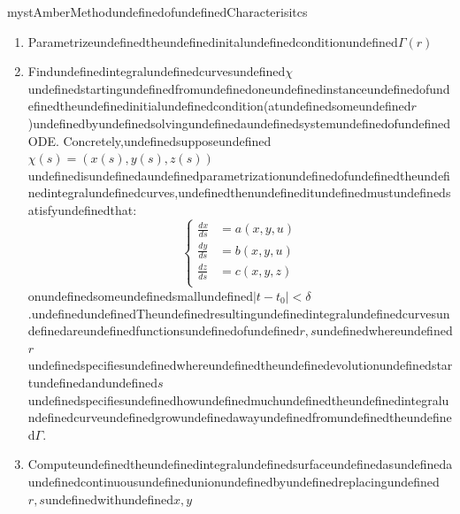 \begin{mystadmonition}{mystAmber}{MethodundefinedofundefinedCharacterisitcs}\begin{enumerate}
\item Parametrizeundefinedtheundefinedinitalundefinedconditionundefined$\Gamma(r)$
\item Findundefinedintegralundefinedcurvesundefined$\chi$undefinedstartingundefinedfromundefinedoneundefinedinstanceundefinedofundefinedtheundefinedinitialundefinedcondition(atundefinedsomeundefined$r$)undefinedbyundefinedsolvingundefinedaundefinedsystemundefinedofundefinedODE.
Concretely,undefinedsupposeundefined$\chi(s) = (x(s),y(s),z(s))$undefinedisundefinedaundefinedparametrizationundefinedofundefinedtheundefinedintegralundefinedcurves,undefinedthenundefineditundefinedmustundefinedsatisfyundefinedthat:
\begin{equation}
\begin{cases}
\frac{dx}{ds}&=a(x,y,u) \\
\frac{dy}{ds}&=b(x,y,u) \\
\frac{dz}{ds}&=c(x,y,z) \\
\end{cases}
\end{equation}
onundefinedsomeundefinedsmallundefined$|t -t_0|<\delta$.undefinedundefinedTheundefinedresultingundefinedintegralundefinedcurvesundefinedareundefinedfunctionsundefinedofundefined$r,s$undefinedwhereundefined$r$undefinedspecifiesundefinedwhereundefinedtheundefinedevolutionundefinedstartundefinedandundefined$s$undefinedspecifiesundefinedhowundefinedmuchundefinedtheundefinedintegralundefinedcurveundefinedgrowundefinedawayundefinedfromundefinedtheundefined$\Gamma$.


\item Computeundefinedtheundefinedintegralundefinedsurfaceundefinedasundefinedaundefinedcontinuousundefinedunionundefinedbyundefinedreplacingundefined$r,s$undefinedwithundefined$x,y$
\end{enumerate}

\end{mystadmonition}
